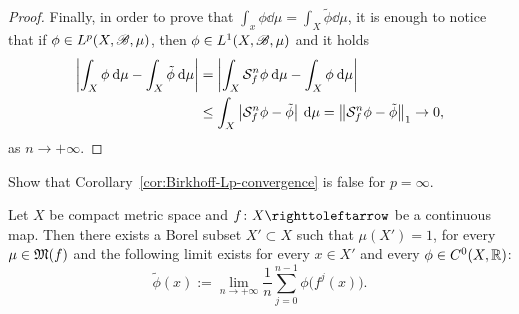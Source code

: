 \begin{proof}
  Finally, in order to prove that $\int_{x}\phi\dd\mu=\int_{X}\tilde\phi\dd\mu$, it is enough to notice that if $\phi\in L^{p}(X,\mathscr{B},\mu)$, then $\phi\in L^{1}(X,\mathscr{B},\mu)$ and it holds
  \begin{displaymath}
    \begin{split}
      \left\lvert{\int_{X}\phi\:\mathrm{d}\mu - \int_{X}\tilde\phi\:\mathrm{d}\mu}\right\rvert &= \left\lvert{\int_{X}\mathcal{S}_{f}^{n}\phi\:\mathrm{d}\mu - \int_{X}\phi\:\mathrm{d}\mu}\right\rvert \\
      &\leq \int_{X}\left\lvert{\mathcal{S}_{f}^{n}\phi-\tilde\phi}\right\rvert\:\mathrm{d}\mu=\left\|{\mathcal{S}_{f}^{n}\phi-\tilde\phi}\right\|_{1}\to 0,
    \end{split}
  \end{displaymath}
  as $n\to+\infty$.
\end{proof}


\begin{exercise}
  Show that Corollary~\ref{cor:Birkhoff-Lp-convergence} is false for $p=\infty$.
\end{exercise}


\begin{corollary}\label{cor:Birkhoff-thm-continuous-setting}
  Let $X$ be compact metric space and $f\colon X\carr$ be a continuous map. Then there exists a Borel subset $X'\subset X$ such that $\mu(X')=1$, for every $\mu\in\operatorname{\mathfrak{M}}(f)$ and the following limit exists for every $x\in X'$ and every $\phi\in C^{0}(X,\mathbb{R})$:
  \begin{displaymath}
    \tilde\phi(x):=\lim_{n\to+\infty} \frac{1}{n}\sum_{j=0}^{n-1}\phi\big(f^{j}(x)\big).
  \end{displaymath}
\end{corollary}

